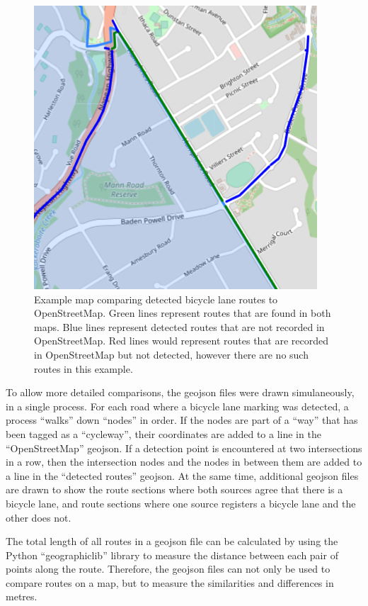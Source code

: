 \documentclass[11pt,twoside]{report}
\begin{document}
\begin{figure}[h!]
\centering
\includegraphics[scale=0.5]{example_comparison_map.png}
\caption{Example map comparing detected bicycle lane routes to OpenStreetMap.  Green lines represent routes that are found in both maps.  Blue lines represent detected routes that are not recorded in OpenStreetMap.  Red lines would represent routes that are recorded in OpenStreetMap but not detected, however there are no such routes in this example.}
\label{fig:004}
\end{figure}

To allow more detailed comparisons, the geojson files were drawn simulaneously, in a single process.  For each road where a bicycle lane marking was detected, a process ``walks'' down ``nodes'' in order.  If the nodes are part of a ``way'' that has been tagged as a ``cycleway'', their coordinates are added to a line in the ``OpenStreetMap'' geojson.  If a detection point is encountered at two intersections in a row, then the intersection nodes and the nodes in between them are added to a line in the ``detected routes'' geojson.  At the same time, additional geojson files are drawn to show the route sections where both sources agree that there is a bicycle lane, and route sections where one source registers a bicycle lane and the other does not.

The total length of all routes in a geojson file can be calculated by using the Python ``geographiclib'' library to measure the distance between each pair of points along the route.  Therefore, the geojson files can not only be used to compare routes on a map, but to measure the similarities and differences in metres.
\end{document}
